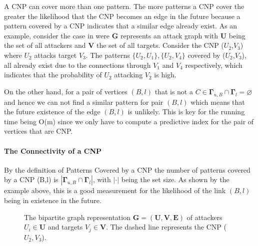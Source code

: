 A CNP can cover more than one pattern. The more patterns a CNP cover the greater the likelihood that the CNP becomes an edge in the future because a pattern covered by a CNP indicates that a similar edge already exist. As an example, consider the case in  were $\textbf{G}$ represents an attack graph with $\textbf{U}$ being the set of all attackers and $\textbf{V}$ the set of all targets. Consider the CNP ($U_2$,$V_3$) where $U_2$ attacks target $V_3$. The patterns $\{U_2,U_1\},\{U_2,V_4\}$ covered by ($U_2$,$V_3$), all already exist due to the connections through $V_1$ and $V_4$ respectively, which indicates that the probability of $U_2$ attacking $V_2$ is high.

On the other hand, for a pair of vertices $(B,l)$ that is not a $C\in\bm{\Gamma}_{u,B}\cap\bm{\Gamma}_{l} = \varnothing$ and hence we can not find a similar pattern for pair $(B,l)$ which means that the future existence of the edge $(B,l)$ is unlikely. This is key for the running time being O(m) since we only have to compute a predictive index for the pair of vertices that are CNP.

\paragraph{The Connectivity of a CNP}
By the definition of Patterns Covered by a CNP the number of patterns covered by a CNP (B,l) is $|\bm{\Gamma}_{u,B}\cap\bm{\Gamma}_{l}|$, with $|\cdot|$ being the set size. As shown by the example above, this is a good measurement for the likelihood of the link $(B,l)$ being in existence in the future.

\begin{figure}[!ht]
\centering

\caption{\label{fig:cnp} The bipartite graph representation $\textbf{G}=(\textbf{U},\textbf{V},\textbf{E})$ of attackers $U_i\in\textbf{U}$ and targets $V_j\in\textbf{V}$. The dashed line represents the CNP ($U_2,V_3$).}
\end{figure}

